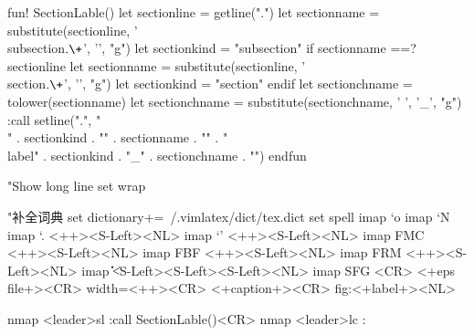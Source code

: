 fun! SectionLable()
    let sectionline = getline(".")
    let  sectionname = substitute(sectionline, '\\subsection{\(.\+\)}', '\1', "g")
    let  sectionkind = "subsection"
    if sectionname ==? sectionline
      let sectionname = substitute(sectionline, '\\section{\(.\+\)}', '\1', "g")
      let sectionkind = "section"
    endif
    let sectionchname = tolower(sectionname)
    let sectionchname = substitute(sectionchname, ' ', '_', "g")
    :call setline(".", "\\" . sectionkind . "{" . sectionname . "}" . " \\label{" . sectionkind . "_" . sectionchname . "}")
endfun

"Show long line
set wrap

"补全词典
set dictionary+=~/.vimlatex/dict/tex.dict
set spell
imap `o \omega
imap `N \nabla
imap `. \dfrac{<++>}{<++>}<++><S-Left><NL>
imap `' \phantom{<++>}<++><S-Left><NL>
imap FMC \mathcal{<++>}<++><S-Left><NL>
imap FBF \mathbf{<++>}<++><S-Left><NL>
imap FRM \mathrm{<++>}<++><S-Left><NL>
imap \|\| \left\|<++>\right\|<++><S-Left><S-Left><S-Left><NL>
imap SFG <CR>        {<+eps file+>}<CR>        {width=<++>}<CR>        {<+caption+>}<CR>        {fig:<+label+>}<NL>

nmap <leader>sl :call SectionLable()<CR>
nmap <leader>lc :%

